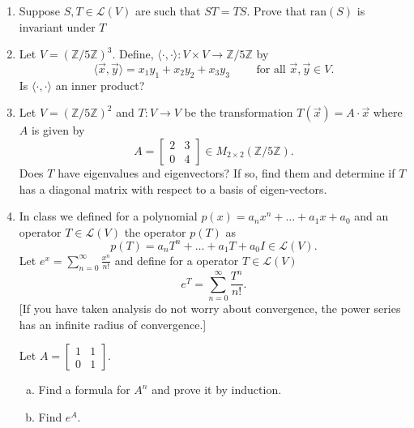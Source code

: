 \documentclass[12pt,letterpaper]{article}
\theoremstyle{plain}
\theoremstyle{definition}
\begin{document}
\begin{enumerate}[1.]
\item Suppose $S,T\in \mathcal{L}(V)$ are such that $ST=TS$. Prove that $\text{ran}(S)$ is invariant under $T$
\item Let $V=\left(\mathbb{Z}/5\mathbb{Z}\right)^3$. Define, $\langle \cdot, \cdot \rangle: V\times V\rightarrow \mathbb{Z}/5\mathbb{Z}$ by 
\[\langle\vec{x},\vec{y}\rangle =x_1y_1+x_2y_2+x_3y_3 \quad \quad \text{ for all }\vec{x},\vec{y}\in V.\] 
Is $\langle \cdot, \cdot \rangle$ an inner product?
\item Let $V=\left(\mathbb{Z}/5\mathbb{Z}\right)^2$ and $T:V\rightarrow V$ be the transformation $T(\vec{x})=A\cdot \vec{x}$ where $A$ is given by 
\[A=\begin{bmatrix}2 & 3 \\ 0 & 4\end{bmatrix}\in M_{2\times 2}(\mathbb{Z}/5\mathbb{Z}).\]
Does $T$ have eigenvalues and eigenvectors? If so, find them and determine if $T$ has a diagonal matrix with respect to a basis of eigen-vectors. 
\item In class we defined for a polynomial $p(x)=a_nx^n+\ldots+a_1x +a_0$ and an operator $T\in \mathcal{L}(V)$ the operator $p(T)$ as 
\[p(T)=a_nT^n+\ldots +a_1T+a_0I\in \mathcal{L}(V).\]
Let $e^x=\sum_{n=0}^\infty \frac{x^n}{n!}$ and define for a operator $T\in \mathcal{L}(V)$ 
\[e^{T}=\sum_{n=0}^\infty \frac{T^n}{n!}.\]
[If you have taken analysis do not worry about convergence, the power series has an infinite radius of convergence.]

Let $A=\begin{bmatrix}1 & 1 \\ 0 & 1\end{bmatrix}$. 

\begin{enumerate}[(a)]
\item Find a formula for $A^n$ and prove it by induction. 
\item Find $e^A$.
\end{enumerate}


\end{enumerate}
\end{document}
